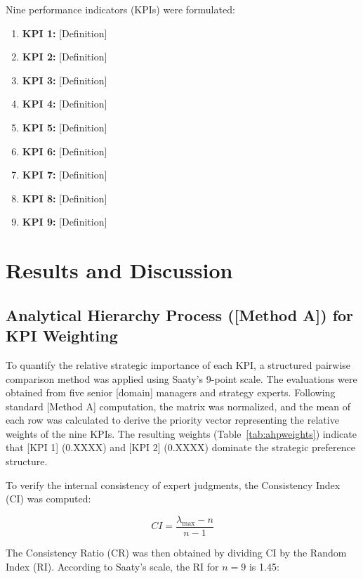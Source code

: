 \documentclass[10pt,twocolumn]{article}
\begin{document}
Nine performance indicators (KPIs) were formulated:

\begin{enumerate}
  \item \textbf{KPI 1:} [Definition]
  \item \textbf{KPI 2:} [Definition]
  \item \textbf{KPI 3:} [Definition]
  \item \textbf{KPI 4:} [Definition]
  \item \textbf{KPI 5:} [Definition]
  \item \textbf{KPI 6:} [Definition]
  \item \textbf{KPI 7:} [Definition]
  \item \textbf{KPI 8:} [Definition]
  \item \textbf{KPI 9:} [Definition]
\end{enumerate}

\section{Results and Discussion}

\subsection{Analytical Hierarchy Process ([Method A]) for KPI
Weighting}

To quantify the relative strategic importance of each KPI, a
structured pairwise comparison method was applied using Saaty's
9-point scale. The evaluations were obtained from five senior
[domain] managers and strategy experts. Following standard [Method
A] computation, the matrix was normalized, and the mean of each
row was calculated to derive the priority vector representing the
relative weights of the nine KPIs. The resulting weights
(Table~\ref{tab:ahpweights}) indicate that [KPI 1] (0.XXXX) and
[KPI 2] (0.XXXX) dominate the strategic preference structure.

To verify the internal consistency of expert judgments, the
Consistency Index (CI) was computed:

\begin{equation}
  CI = \frac{\lambda_{\max} - n}{n - 1}
  \label{eq:ci}
\end{equation}

The Consistency Ratio (CR) was then obtained by dividing CI by the
Random Index (RI). According to Saaty's scale, the RI for $n = 9$
is 1.45:
\end{document}
